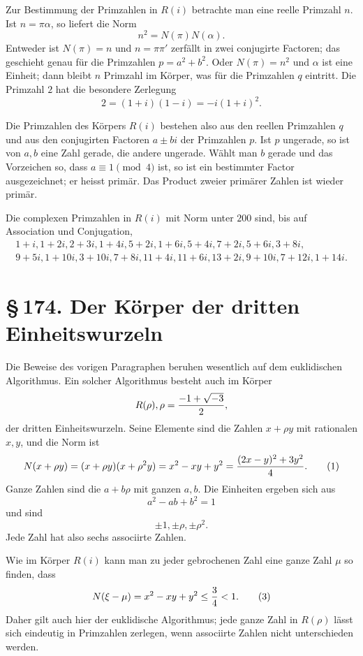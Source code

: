 \documentclass[11pt]{article}
\providecommand{\sect}[2]{\section*{\S\,#1. #2}}
\begin{document}
Zur Bestimmung der Primzahlen in $R(i)$ betrachte man eine reelle Primzahl $n$. Ist $n=\pi\alpha$, so liefert die Norm
\[
        n^2=N(\pi)N(\alpha).                                           \tag{8}
\]
Entweder ist $N(\pi)=n$ und $n=\pi\pi'$ zerfällt in zwei conjugirte Factoren; das geschieht genau für die Primzahlen $p=a^2+b^2$. Oder $N(\pi)=n^2$ und $\alpha$ ist eine Einheit; dann bleibt $n$ Primzahl im Körper, was für die Primzahlen $q$ eintritt. Die Primzahl $2$ hat die besondere Zerlegung
\[
        2=(1+i)(1-i)=-i(1+i)^2.                                        \tag{9}
\]

Die Primzahlen des Körpers $R(i)$ bestehen also aus den reellen Primzahlen $q$ und aus den conjugirten Factoren $a\pm bi$ der Primzahlen $p$. Ist $p$ ungerade, so ist von $a,b$ eine Zahl gerade, die andere ungerade. Wählt man $b$ gerade und das Vorzeichen so, dass $a\equiv1\pmod4$ ist, so ist ein bestimmter Factor ausgezeichnet; er heisst primär. Das Product zweier primärer Zahlen ist wieder primär.

Die complexen Primzahlen in $R(i)$ mit Norm unter $200$ sind, bis auf Association und Conjugation,
\[
\begin{gathered}
1+i,
1+2i,
2+3i,
1+4i,
5+2i,
1+6i,
5+4i,
7+2i,
5+6i,
3+8i,\\
9+5i,
1+10i,
3+10i,
7+8i,
11+4i,
11+6i,
13+2i,
9+10i,
7+12i,
1+14i.
\end{gathered}
\]

\sect{174}{Der Körper der dritten Einheitswurzeln}

Die Beweise des vorigen Paragraphen beruhen wesentlich auf dem euklidischen Algorithmus. Ein solcher Algorithmus besteht auch im Körper
\[
        R(\rho),
        \rho={-1+\sqrt{-3}\over2},
\]
der dritten Einheitswurzeln. Seine Elemente sind die Zahlen $x+\rho y$ mit rationalen $x,y$, und die Norm ist
\[
        N(x+
\rho y)=(x+
\rho y)(x+
\rho^2y)=x^2-xy+y^2
        ={(2x-y)^2+3y^2\over4}.                                      \tag{1}
\]
Ganze Zahlen sind die $a+b\rho$ mit ganzen $a,b$. Die Einheiten ergeben sich aus
\[
        a^2-ab+b^2=1
\]
und sind
\[
        \pm1,
        \pm\rho,
        \pm\rho^2.                                                     \tag{2}
\]
Jede Zahl hat also sechs associirte Zahlen.

Wie im Körper $R(i)$ kann man zu jeder gebrochenen Zahl eine ganze Zahl $\mu$ so finden, dass
\[
        N(\xi-
\mu)=x^2-xy+y^2\le {3\over4}<1.                           \tag{3}
\]
Daher gilt auch hier der euklidische Algorithmus; jede ganze Zahl in $R(\rho)$ lässt sich eindeutig in Primzahlen zerlegen, wenn associirte Zahlen nicht unterschieden werden.
\end{document}
